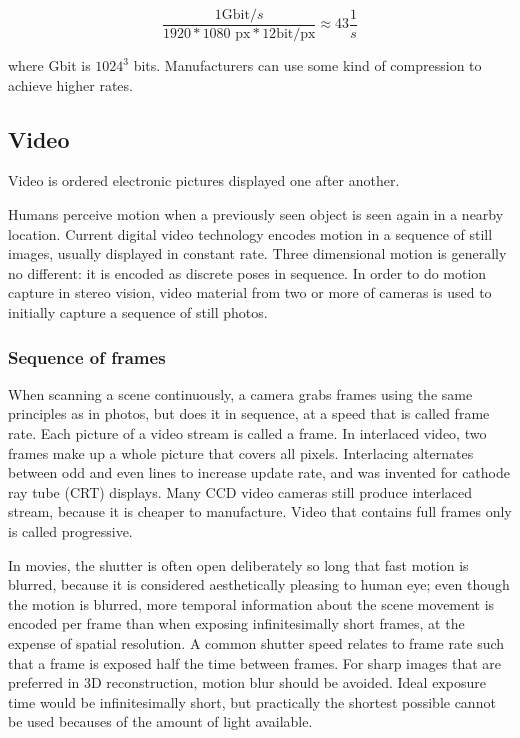 \[
	\frac{1 \text{Gbit}/s}{1920 * 1080 \text{ px} * 12 \text{bit}/\text{px}} \approx 43 \frac{1}{s}
\]

where Gbit is $1024^3$ bits.
Manufacturers can use some kind of compression to achieve higher rates.



\subsection{Video} \label{sec:video} %

Video is ordered electronic pictures displayed one after another.



Humans perceive motion when a previously seen object is seen again in a nearby location.
Current digital video technology encodes motion in a sequence of still images, usually displayed in constant rate.
Three dimensional motion is generally no different: it is encoded as discrete poses in sequence.
In order to do motion capture in stereo vision, video material from two or more of cameras is used to initially capture a sequence of still photos.


\subsubsection{Sequence of frames} %

When scanning a scene continuously, a camera grabs frames using the same principles as in photos, but does it in sequence, at a speed that is called frame rate.
Each picture of a video stream is called a frame.
In interlaced video, two frames make up a whole picture that covers all pixels.
Interlacing alternates between odd and even lines to increase update rate, and was invented for cathode ray tube (CRT) displays.
Many CCD video cameras still produce interlaced stream, because it is cheaper to manufacture.
Video that contains full frames only is called progressive.

In movies, the shutter is often open deliberately so long that fast motion is blurred, because it is considered aesthetically pleasing to human eye; even though the motion is blurred, more temporal information about the scene movement is encoded per frame than when exposing infinitesimally short frames, at the expense of spatial resolution.
A common shutter speed relates to frame rate such that a frame is exposed half the time between frames.
\cite{wilson2004anton}
For sharp images that are preferred in 3D reconstruction, motion blur should be avoided.
Ideal exposure time would be infinitesimally short, but practically the shortest possible cannot be used becauses of the amount of light available.

